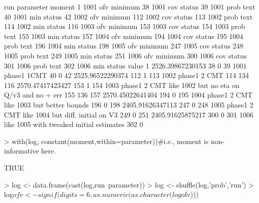 \begin{Schunk}
\begin{Soutput}
     run parameter  moment
1   1001       ofv minimum
38  1001       cov  status
39  1001      prob    text
40  1001       min  status
42  1002       ofv minimum
112 1002       cov  status
113 1002      prob    text
114 1002       min  status
116 1003       ofv minimum
153 1003       cov  status
154 1003      prob    text
155 1003       min  status
157 1004       ofv minimum
194 1004       cov  status
195 1004      prob    text
196 1004       min  status
198 1005       ofv minimum
247 1005       cov  status
248 1005      prob    text
249 1005       min  status
251 1006       ofv minimum
300 1006       cov  status
301 1006      prob    text
302 1006       min  status
                                                          value
1                                              2526.39867230153
38                                                            0
39                                             1001 phase1 1CMT
40                                                            0
42                                             2525.96522290374
112                                                           1
113                                           1002 phase1 2 CMT
114                                                         134
116                                            2570.47417423427
153                                                           1
154 1003 phase1 2 CMT like 1002 but no eta on Q/v3 and no + err
155                                                         136
157                                            2570.45022641404
194                                                           0
195               1004 phase1 2 CMT like 1003 but better bounds
196                                                           0
198                                            2405.91626347113
247                                                           0
248         1005 phase1 2 CMT like 1004 but diff. initial on V3
249                                                           0
251                                            2405.91625875217
300                                                           0
301               1006 like 1005 with tweaked initial estimates
302                                                           0
\end{Soutput}
\begin{Sinput}
> with(log, constant(moment,within=parameter))#i.e., moment is non-informative here.
\end{Sinput}
\begin{Soutput}
[1] TRUE
\end{Soutput}
\begin{Sinput}
> log <- data.frame(cast(log,run~parameter))
> log <- shuffle(log,'prob','run')
> log$ofv <- signif(digits=6,as.numeric(as.character(log$ofv)))
\end{Sinput}
\end{Schunk}
